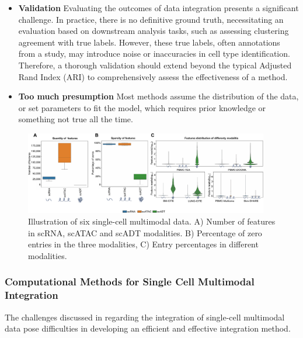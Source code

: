 \begin{itemize}
	\item \textbf{Validation} 
	Evaluating the outcomes of data integration presents a significant challenge. In practice, there is no definitive ground truth, necessitating an evaluation based on downstream analysis tasks, such as assessing clustering agreement with true labels. However, these true labels, often annotations from a study, may introduce noise or inaccuracies in cell type identification. Therefore, a thorough validation should extend beyond the typical Adjusted Rand Index (ARI) to comprehensively assess the effectiveness of a method.

    \item \textbf{Too much presumption}
    Most methods assume the distribution of the data, or set parameters to fit the model, which requires prior knowledge or something not true all the time.
    
\end{itemize}

\begin{figure}[!ht]
	\centering
	\includegraphics[width=0.95\textwidth]{feature_statistic/fig}
	\vspace{0.1cm}
	\caption[features characteristics comparison showing the challenge of multimodal integration.]{Illustration of six single-cell multimodal data. A) Number of features in scRNA, scATAC and scADT modalities. B) Percentage of zero entries in the three modalities, C) Entry percentages in different modalities.}
	\label{fig:modalities_differences}
\end{figure}


\subsubsection{Computational Methods for Single Cell Multimodal Integration}
\label{background:sec2:integration}
The challenges discussed in  regarding the integration of single-cell multimodal data pose difficulties in developing an efficient and effective integration method. 

